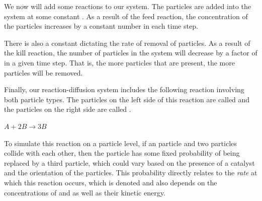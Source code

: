 \begin{qbox}\end{qbox}

We now will add some reactions to our system. The  particles are added into the system at some constant  . As a result of the feed reaction, the concentration of the  particles increases by a constant number in each time step.\\

\begin{note}\end{note}

There is also a  constant  dictating the rate of removal of  particles. As a result of the kill reaction, the number of  particles in the system will decrease by a factor of  in a given time step. That is, the more  particles that are present, the more  particles will be removed.

Finally, our reaction-diffusion system includes the following reaction involving both particle types. The particles on the left side of this reaction are called  and the particles on the right side are called .

\begin{center}
$A + 2B \rightarrow 3B$
\end{center}

To simulate this reaction on a particle level, if an  particle and two  particles collide with each other, then the  particle has some fixed probability of being replaced by a third  particle, which could vary based on the presence of a catalyst and the orientation of the particles. This probability directly relates to the \textit{rate} at which this reaction occurs, which is denoted  and also depends on the concentrations of  and  as well as their kinetic energy.

